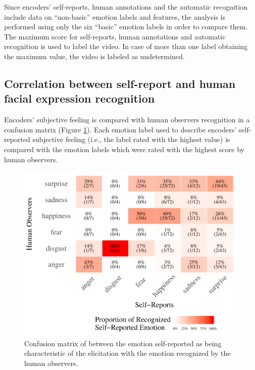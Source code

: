 \documentclass[conference,final,]{IEEEtran}
\makeatletter
\def\maxwidth{\ifdim\Gin@nat@width>\linewidth\linewidth
\else\Gin@nat@width\fi}
\let\Oldincludegraphics\includegraphics
\renewcommand{\includegraphics}[1]{\Oldincludegraphics[width=\maxwidth]{#1}}
\makeatother
\begin{document}
Since encoders' self-reports, human annotations and the automatic
recognition include data on ``non-basic'' emotion labels and features,
the analysis is performed using only the six ``basic'' emotion labels in
order to compare them. The maximum score for self-reports, human
annotations and automatic recognition is used to label the video. In
case of more than one label obtaining the maximum value, the video is
labeled as undetermined.

\hypertarget{correlation-between-self-report-and-human-facial-expression-recognition}{%
\subsection{Correlation between self-report and human facial expression
recognition}\label{correlation-between-self-report-and-human-facial-expression-recognition}}

Encoders' subjective feeling is compared with human observers
recognition in a confusion matrix (Figure
\ref{fig:confusionMatrix_sr_hr}). Each emotion label used to describe
encoders' self-reported subjective feeling (i.e., the label rated with
the highest value) is compared with the emotion labels which were rated
with the highest score by human observers.

\begin{figure}
\centering
\includegraphics{ACII_2019_paper_files/figure-latex/confusionMatrix_sr_hr-1.pdf}
\caption{\label{fig:confusionMatrix_sr_hr}Confusion matrix of between
the emotion self-reported as being characteristic of the elicitation
with the emotion recognized by the human observers.}
\end{figure}
\end{document}
